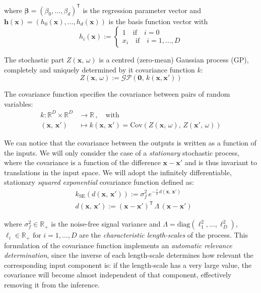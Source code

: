 \noindent
where $\boldsymbol{\beta} = (\beta_0,\dots,\beta_d)^\mathsf{T}$ is the regression parameter vector and $\mathbf{h}(\mathbf{x}) = (h_0(\mathbf{x}),\dots,h_d(\mathbf{x}))$ is the basis function vector with
%
\begin{equation}
    h_i(\mathbf{x}):=\begin{cases}
        1 \quad\text{if}\quad i = 0 \\
        x_i \quad\text{if}\quad i=1,\dots,D
    \end{cases}
\end{equation}

The stochastic part $Z(\mathbf{x},\,\omega)$ is a centred (zero-mean) Gaussian process (\acs{GP}), completely and uniquely determined by it covariance function $k$:
%
\begin{equation}
    Z(\mathbf{x},\,\omega):= \mathcal{GP}(\mathbf{0},\,k(\mathbf{x},\mathbf{x'}))
\end{equation}

\noindent
The covariance function specifies the covariance between pairs of random variables:
%
\begin{align}
    k\colon\mathbb{R}^{D}\times\mathbb{R}^{D}&\to\mathbb{R}\,,\quad\text{with} \\
    (\mathbf{x},\,\mathbf{x}')&\mapsto k(\mathbf{x},\,\mathbf{x}') = \text{Cov}(Z(\mathbf{x},\,\omega),\, Z(\mathbf{x}',\,\omega))
\end{align}

\noindent
We can notice that the covariance between the outputs is written as a function of the inputs. We will only consider the case of a \textit{stationary} stochastic process, where the covariance is a function of the difference $\mathbf{x}-\mathbf{x}'$ and is thus invariant to translations in the input space. We will adopt the infinitely differentiable, stationary \textit{squared exponential} covariance function defined as:
%
\begin{align}
     &k_{\text{SE}}(d(\mathbf{x},\,\mathbf{x}')) := \sigma_f^2\, e^{-\frac{1}{2}\,d(\mathbf{x},\,\mathbf{x}')} \\
     &d(\mathbf{x},\,\mathbf{x}') := (\mathbf{x}-\mathbf{x}')^\mathsf{T}\,\Lambda\,(\mathbf{x}-\mathbf{x}')
\end{align}

\noindent
where $\sigma_f^2\in\mathbb{R}_{+}$ is the noise-free signal variance and $\Lambda=\text{diag}(\ell_1^2,\dots,\ell_D^2)$, $\ell_i\in\mathbb{R}_{+}\,\,\text{for}\,\,i=1,\dots,D$ are the \textit{characteristic length-scales} of the process. This formulation of the covariance function implements an \textit{automatic relevance determination}, since the inverse of each length-scale determines how relevant the corresponding input component is: if the length-scale has a very large value, the covariance will become almost independent of that component, effectively removing it from the inference.

